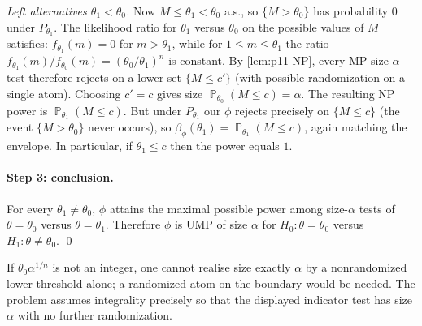 \documentclass[11pt,a4paper]{article}
\DeclareMathOperator{\Pbb}{\mathbb{P}}
\begin{document}
\textit{Left alternatives \(\theta_1<\theta_0\).}
Now \(M\le\theta_1<\theta_0\) a.s., so \(\{M>\theta_0\}\) has probability \(0\) under \(P_{\theta_1}\). The likelihood ratio for \(\theta_1\) versus \(\theta_0\) on the possible values of \(M\) satisfies: \(f_{\theta_1}(m)=0\) for \(m>\theta_1\), while for \(1\le m\le\theta_1\) the ratio \(f_{\theta_1}(m)/f_{\theta_0}(m)=(\theta_0/\theta_1)^n\) is constant. By \cref{lem:p11-NP}, every MP size-\(\alpha\) test therefore rejects on a lower set \(\{M\le c'\}\) (with possible randomization on a single atom). Choosing \(c'=c\) gives size \(\Pbb_{\theta_0}(M\le c)=\alpha\). The resulting NP power is \(\Pbb_{\theta_1}(M\le c)\). But under \(P_{\theta_1}\) our \(\phi\) rejects precisely on \(\{M\le c\}\) (the event \(\{M>\theta_0\}\) never occurs), so \(\beta_\phi(\theta_1)=\Pbb_{\theta_1}(M\le c)\), again matching the envelope. In particular, if \(\theta_1\le c\) then the power equals \(1\).

\paragraph{Step 3: conclusion.}
For every \(\theta_1\neq\theta_0\), \(\phi\) attains the maximal possible power among size-\(\alpha\) tests of \(\theta=\theta_0\) versus \(\theta=\theta_1\). Therefore \(\phi\) is UMP of size \(\alpha\) for \(H_0:\theta=\theta_0\) versus \(H_1:\theta\neq\theta_0\).
\qed

\begin{remark*}
If \(\theta_0\alpha^{1/n}\) is not an integer, one cannot realise size exactly \(\alpha\) by a nonrandomized lower threshold alone; a randomized atom on the boundary would be needed. The problem assumes integrality precisely so that the displayed indicator test has size \(\alpha\) with no further randomization.
\end{remark*}
\end{document}
